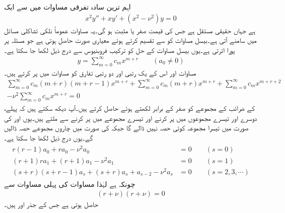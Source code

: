 اہم ترین سادہ تفرقی مساوات میں سے ایک 
\begin{align}\label{مساوات_بیسل_الف}
x^2y''+xy'+(x^2-\nu^2)y=0
\end{align}
ہے جہاں  حقیقی مستقل ہے جس کی قیمت صفر یا مثبت ہو گی۔یہ مساوات عموماً نلکی تشاکلی مسائل میں سامنے آتی ہے۔بیسل مساوات کو  سے تقسیم کرتے ہوئے معیاری صورت  حاصل ہوتی ہے جو مسئلہ  پر پورا اترتی ہے۔یوں بیسل مساوات کے حل کو ترکیب فروبنیوس سے درج ذیل لکھا جا سکتا ہے۔
\begin{align}\label{مساوات_بیسل_ب}
y=\sum_{m=0}^{\infty}c_mx^{m+r}\quad \quad (a_0 \ne 0)
\end{align}
مساوات  اور اس کے یک رتبی اور دو رتبی تفارق کو مساوات  میں پر کرتے ہیں۔
\begin{multline*}
\sum_{m=0}^{\infty}c_m(m+r)(m+r-1)x^{m+r}+\sum_{m=0}^{\infty}c_m(m+r)x^{m+r}+\sum_{m=0}^{\infty}c_mx^{m+r+2}\\
-\nu^2\sum_{m=0}^{\infty}c_mx^{m+r}=0
\end{multline*}
 کے ضرائب کے مجموعے کو صفر کے برابر لکھتے ہوئے  حاصل کرتے ہیں۔آپ دیکھ سکتے ہیں کہ  پہلے، دوسرے اور تیسرے مجموعوں میں  پر کرنے اور تیسرے مجموعے میں  پر کرنے سے ملتے ہیں۔یوں  اور  کی صورت میں تیسرا مجموعہ کوئی حصہ نہیں ڈالے گا جبکہ  کی صورت میں چاروں مجموعے حصہ ڈالیں گے۔یوں درج ذیل لکھا جا سکتا ہے۔
\begin{gather}
\begin{aligned}\label{مساوات_بیسل_پ}
r(r-1)a_0+ra_0-\nu^2a_0&=0\quad \quad (s=0)\\
(r+1)ra_1+(r+1)a_1-\nu^2a_1&=0\quad \quad (s=1)\\
(s+r)(s+r-1)a_s+(s+r)a_s+a_{s-2}-\nu^2a_s&=0\quad \quad (s=2,3,\cdots)
\end{aligned}
\end{gather}  
چونکہ  ہے لہٰذا مساوات  کی پہلی مساوات  سے   
\begin{align}\label{مساوات_بیسل_ت}
(r+\nu)(r+\nu)=0
\end{align}
حاصل ہوتی ہے جس کے جذر  اور  ہیں۔


